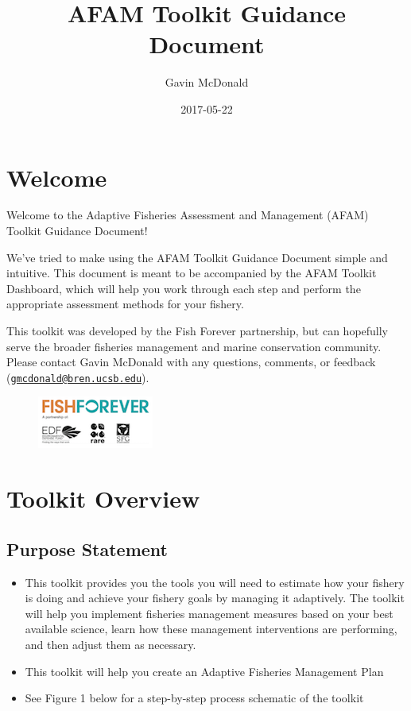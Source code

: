 \documentclass[]{book}
\title{AFAM Toolkit Guidance Document}
\author{Gavin McDonald}
\date{2017-05-22}
\begin{document}
\maketitle

{
\setcounter{tocdepth}{1}
\tableofcontents
}
\chapter*{Welcome}\label{welcome}

Welcome to the Adaptive Fisheries Assessment and Management (AFAM)
Toolkit Guidance Document!

We've tried to make using the AFAM Toolkit Guidance Document simple and
intuitive. This document is meant to be accompanied by the AFAM Toolkit
Dashboard, which will help you work through each step and perform the
appropriate assessment methods for your fishery.

This toolkit was developed by the Fish Forever partnership, but can
hopefully serve the broader fisheries management and marine conservation
community. Please contact Gavin McDonald with any questions, comments,
or feedback
(\href{mailto:gmcdonald@bren.ucsb.edu}{\nolinkurl{gmcdonald@bren.ucsb.edu}}).

\begin{figure}
\centering
\includegraphics{myMediaFolder/media/FF_Logo.png}
\caption{}
\end{figure}

\chapter*{Toolkit Overview}\label{toolkit-overview}

\section{Purpose Statement}\label{purpose-statement}

\begin{itemize}
\item
  This toolkit provides you the tools you will need to estimate how your
  fishery is doing and achieve your fishery goals by managing it
  adaptively. The toolkit will help you implement fisheries management
  measures based on your best available science, learn how these
  management interventions are performing, and then adjust them as
  necessary.
\item
  This toolkit will help you create an Adaptive Fisheries Management
  Plan
\item
  See Figure 1 below for a step-by-step process schematic of the toolkit
\end{itemize}
\end{document}
